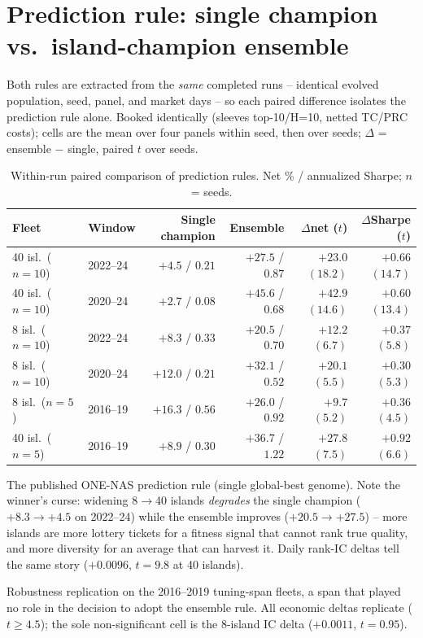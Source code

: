 \documentclass[11pt]{article}
\begin{document}
\section*{Prediction rule: single champion vs.\ island-champion ensemble}

Both rules are extracted from the \emph{same} completed runs -- identical
evolved population, seed, panel, and market days -- so each paired
difference isolates the prediction rule alone. Booked identically
(sleeves top-10/H=10, netted TC/PRC costs); cells are the mean over four
panels within seed, then over seeds; $\Delta$ = ensemble $-$ single, paired
$t$ over seeds.

\begin{table}[h]
\centering
\begin{threeparttable}
\caption{Within-run paired comparison of prediction rules. Net \% /
annualized Sharpe; $n$ = seeds.}
\begin{tabular}{llrrrr}
\toprule
Fleet & Window & Single champion\tnote{a} & Ensemble & $\Delta$net ($t$) & $\Delta$Sharpe ($t$) \\
\midrule
40 isl.\ ($n{=}10$) & 2022--24 & $+4.5$ / $0.21$  & $+27.5$ / $0.87$ & $+23.0$ $(18.2)$ & $+0.66$ $(14.7)$ \\
40 isl.\ ($n{=}10$) & 2020--24 & $+2.7$ / $0.08$  & $+45.6$ / $0.68$ & $+42.9$ $(14.6)$ & $+0.60$ $(13.4)$ \\
8 isl.\ ($n{=}10$)  & 2022--24 & $+8.3$ / $0.33$  & $+20.5$ / $0.70$ & $+12.2$ $(6.7)$  & $+0.37$ $(5.8)$ \\
8 isl.\ ($n{=}10$)  & 2020--24 & $+12.0$ / $0.21$ & $+32.1$ / $0.52$ & $+20.1$ $(5.5)$  & $+0.30$ $(5.3)$ \\
\midrule
8 isl.\ ($n{=}5$)\tnote{b}  & 2016--19 & $+16.3$ / $0.56$ & $+26.0$ / $0.92$ & $+9.7$ $(5.2)$   & $+0.36$ $(4.5)$ \\
40 isl.\ ($n{=}5$)\tnote{b} & 2016--19 & $+8.9$ / $0.30$  & $+36.7$ / $1.22$ & $+27.8$ $(7.5)$  & $+0.92$ $(6.6)$ \\
\bottomrule
\end{tabular}
\begin{tablenotes}\footnotesize
\item[a] The published ONE-NAS prediction rule (single global-best genome).
Note the winner's curse: widening 8$\to$40 islands \emph{degrades} the
single champion ($+8.3 \to +4.5$ on 2022--24) while the ensemble improves
($+20.5 \to +27.5$) -- more islands are more lottery tickets for a fitness
signal that cannot rank true quality, and more diversity for an average
that can harvest it. Daily rank-IC deltas tell the same story
($+0.0096$, $t{=}9.8$ at 40 islands).
\item[b] Robustness replication on the 2016--2019 tuning-span fleets, a
span that played no role in the decision to adopt the ensemble rule. All
economic deltas replicate ($t \ge 4.5$); the sole non-significant cell is
the 8-island IC delta ($+0.0011$, $t{=}0.95$).
\end{tablenotes}
\end{threeparttable}
\end{table}
\end{document}
